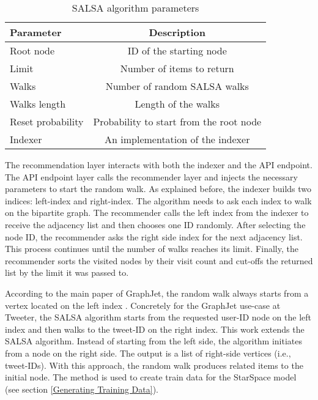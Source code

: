 \begin{table}[!h]
    \centering
    \caption{SALSA algorithm parameters}
    \label{tab:salsa-parameters}
    \begin{tabular}{|l|c|}
        \hline
        \textbf{Parameter} & \textbf{Description} \\
        \hline
        Root node & ID of the starting node \\
        \hline
        Limit & Number of items to return \\
        \hline
        Walks & Number of random SALSA walks \\
        \hline
        Walks length & Length of the walks \\
        \hline
        Reset probability & Probability to start from the root node \\
        \hline
        Indexer & An implementation of the indexer  \\
        \hline
    \end{tabular}
\end{table}


The recommendation layer interacts with both the indexer and the API endpoint. The API endpoint layer calls the recommender layer and injects the necessary parameters to start the random walk. As explained before, the indexer builds two indices: left-index and right-index. The algorithm needs to ask each index to walk on the bipartite graph. The recommender calls the left index from the indexer to receive the adjacency list and then chooses one ID randomly. After selecting the node ID, the recommender asks the right side index for the next adjacency list. This process continues until the number of walks reaches its limit. Finally, the recommender sorts the visited nodes by their visit count and cut-offs the returned list by the limit it was passed to.


According to the main paper of GraphJet, the random walk always starts from a vertex located on the left index \cite{sharmaGraphJetRealtimeContent2016}. Concretely for the GraphJet use-case at Tweeter, the SALSA algorithm starts from the requested user-ID node on the left index and then walks to the tweet-ID on the right index. This work extends the SALSA algorithm. Instead of starting from the left side, the algorithm initiates from a node on the right side. The output is a list of right-side vertices (i.e., tweet-IDs). With this approach, the random walk produces related items to the initial node. The method is used to create train data for the StarSpace model (see section \ref{Generating Training Data}).

